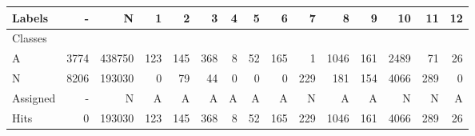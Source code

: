\begin{tabular}{l|r|r|r|r|r|r|r|r|r|r|r|r|r|r}

Labels &     - &       N &    1 &    2 &    3 &  4 &   5 &    6 &    7 &     8 &    9 &    10 &   11 &  12 \\\hline
Classes  &       &         &      &      &      &    &     &      &      &       &      &       &      &     \\\hline
\hline
A        &  3774 &  438750 &  123 &  145 &  368 &  8 &  52 &  165 &    1 &  1046 &  161 &  2489 &   71 &  26 \\\hline
N        &  8206 &  193030 &    0 &   79 &   44 &  0 &   0 &    0 &  229 &   181 &  154 &  4066 &  289 &   0 \\\hline
\hline
Assigned &     - &       N &    A &    A &    A &  A &   A &    A &    N &     A &    A &     N &    N &   A \\\hline
Hits     &     0 &  193030 &  123 &  145 &  368 &  8 &  52 &  165 &  229 &  1046 &  161 &  4066 &  289 &  26 
\end{tabular}

